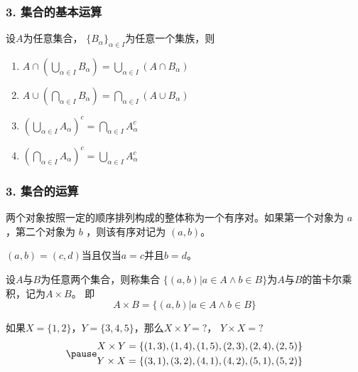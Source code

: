 \documentclass{beamer}
\begin{document}
\begin{CJK*}{UTF8}{gbsn}
\begin{frame}
  \frametitle{3. 集合的基本运算}
\begin{Thm}
设$A$为任意集合， $\{B_{\alpha}\}_{\alpha \in I}$为任意一个集族，则
\begin{enumerate}
\item $A \cap (\bigcup_{\alpha \in I}B_{\alpha}) = \bigcup_{\alpha \in I}(A \cap B_{\alpha})$
\item $A \cup (\bigcap_{\alpha \in I}B_{\alpha}) = \bigcap_{\alpha \in I}(A \cup B_{\alpha})$
\item $(\bigcup_{\alpha \in I}A_{\alpha})^c=\bigcap_{\alpha\in I}A_{\alpha}^c$
\item $(\bigcap_{\alpha \in I}A_{\alpha})^c=\bigcup_{\alpha\in I}A_{\alpha}^c$
\end{enumerate}
\end{Thm}
\end{frame}
\begin{frame}
  \frametitle{3. 集合的运算}
  \begin{Def}
    两个对象按照一定的顺序排列构成的整体称为一个\alert{有序对}。如果第一个对象为 $a$ ，第二个对象为 $b$ ，则该有序对记为 $(a,b)$。

    $(a,b)=(c,d)$当且仅当$a=c$并且$b=d$。
  \end{Def}\pause
  \begin{Def}
    设$A$与$B$为任意两个集合，则称集合 $\{(a,b)|a\in A \land b \in B\}$为$A$与$B$的\alert{笛卡尔乘积}，记为$A \times B$。
即
\begin{equation*}
  A \times B = \{(a,b)|a \in A \land b \in B\}
\end{equation*}
  \end{Def}\pause
\vspace{-0.5cm}
  \begin{Ex}
    如果$X=\{1,2\}$，$Y=\{3,4,5\}$，那么$X \times Y = ?$， $Y \times X = ?$
    \begin{equation*}
\pause
      \begin{split}
       X \times Y &= \{ (1,3), (1,4), (1,5), (2,3), (2,4), (2, 5) \}\\
       Y \times X &= \{(3,1), (3,2), (4,1), (4,2), (5,1), (5,2)\}
      \end{split}
    \end{equation*}
  \end{Ex}
\end{frame}


\end{CJK*}
\end{document}
